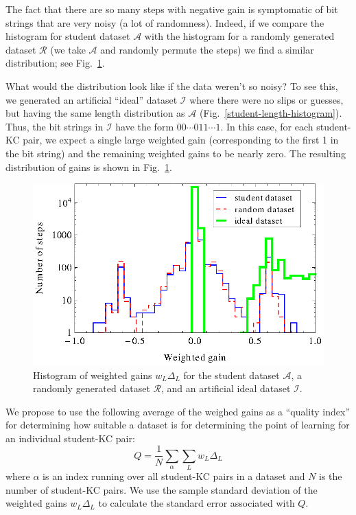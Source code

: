 \documentclass{acmlarge-edm}
\begin{document}
The fact that there are so many steps with negative gain is
symptomatic of bit strings that are very noisy (a lot of
randomness).  Indeed, if we compare the histogram for student
dataset $\mathcal{A}$ with the histogram for a randomly 
generated dataset $\mathcal{R}$ (we take $\mathcal{A}$ and
randomly permute the steps) we find a similar distribution;
see Fig.~\ref{weighted-gain-histogram2}.

What would the distribution look like if the data weren't 
so noisy?  To see this, we generated an artificial ``ideal'' dataset
$\mathcal{I}$ where there were no slips or guesses, but having
the same length distribution as $\mathcal{A}$ 
(Fig.~\ref{student-length-histogram}).  Thus, the bit strings
in $\mathcal{I}$ have the form $00\cdots011\cdots1$.
In this case, for each student-KC pair, we expect a single 
large weighted gain (corresponding to the first 1 in the bit string) 
and the remaining weighted gains to be nearly zero.  The resulting 
distribution of gains is shown
in  Fig.~\ref{weighted-gain-histogram2}.

\begin{figure}
  \centering \includegraphics{weighted-gain-histogram2.eps}
   \caption{Histogram of weighted gains $w_L \Delta_L$ for
     the student dataset $\mathcal{A}$, 
     a randomly generated dataset $\mathcal{R}$,
     and an artificial ideal dataset $\mathcal{I}$.}
    \label{weighted-gain-histogram2}
\end{figure}


We propose to use the following average of the weighed gains as
a ``quality index'' for determining how suitable a 
dataset is for determining the point of learning for an individual
student-KC pair:
%
\begin{equation}
           Q= \frac{1}{N} \sum_\alpha \sum_L w_L \Delta_L
\end{equation}
%
where $\alpha$ is an index running over all student-KC pairs in a 
dataset and $N$ is the number of student-KC pairs.
We use the sample standard deviation of the weighted gains $w_L \Delta_L$
to calculate the standard error associated with $Q$. 
\end{document}
